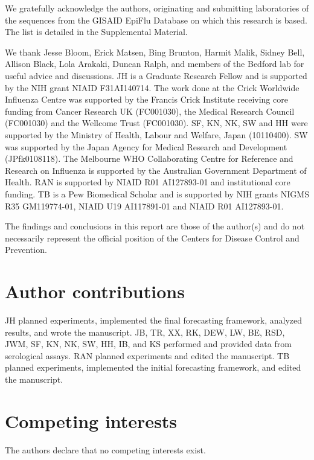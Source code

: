 \documentclass[9pt,lineno]{elife} %
\providecommand{\DIFaddbegin}{} %
\providecommand{\DIFaddend}{} %
\providecommand{\DIFdelbegin}{} %
\providecommand{\DIFdelend}{} %
\providecommand{\DIFaddbegin}{} %
\providecommand{\DIFaddend}{} %
\providecommand{\DIFdelbegin}{} %
\providecommand{\DIFdelend}{} %
\newcommand{\DIFscaledelfig}{0.5}
\newlength{\DIFdelgraphicswidth} %
\newlength{\DIFdelgraphicsheight} %
\newcommand{\DIFaddincludegraphics}[2][]{{\color{blue}\fbox{\DIFOincludegraphics[#1]{#2}}}} %
\newcommand{\DIFdelincludegraphics}[2][]{%
\sbox{\DIFdelgraphicsbox}{\DIFOincludegraphics[#1]{#2}}%
\settoboxwidth{\DIFdelgraphicswidth}{\DIFdelgraphicsbox} %
\settoboxtotalheight{\DIFdelgraphicsheight}{\DIFdelgraphicsbox} %
\scalebox{\DIFscaledelfig}{%
\parbox[b]{\DIFdelgraphicswidth}{\usebox{\DIFdelgraphicsbox}\\[-\baselineskip] \rule{\DIFdelgraphicswidth}{0em}}\llap{\resizebox{\DIFdelgraphicswidth}{\DIFdelgraphicsheight}{%
\setlength{\unitlength}{\DIFdelgraphicswidth}%
\begin{picture}(1,1)%
\thicklines\linethickness{2pt} %
{\color[rgb]{1,0,0}\put(0,0){\framebox(1,1){}}}%
{\color[rgb]{1,0,0}\put(0,0){\line( 1,1){1}}}%
{\color[rgb]{1,0,0}\put(0,1){\line(1,-1){1}}}%
\end{picture}%
}\hspace*{3pt}}} %
} %
\DeclareRobustCommand{\DIFaddbegin}{\DIFOaddbegin \let\includegraphics\DIFaddincludegraphics} %
\DeclareRobustCommand{\DIFaddend}{\DIFOaddend \let\includegraphics\DIFOincludegraphics} %
\DeclareRobustCommand{\DIFdelbegin}{\DIFOdelbegin \let\includegraphics\DIFdelincludegraphics} %
\DeclareRobustCommand{\DIFdelend}{\DIFOaddend \let\includegraphics\DIFOincludegraphics} %
\begin{document}
We gratefully acknowledge the authors, originating and submitting laboratories of the sequences from the GISAID EpiFlu Database \DIFdelbegin %
\DIFdelend \DIFaddbegin \citep{shu2017gisaid} \DIFaddend on which this research is based. The list is detailed in the Supplemental Material.

We thank Jesse Bloom, Erick Matsen, Bing Brunton, Harmit Malik, Sidney Bell, Allison Black, Lola Arakaki, Duncan Ralph, and members of the Bedford lab for useful advice and discussions.
JH is a Graduate Research Fellow and is supported by the NIH grant NIAID F31AI140714.
The work done at the Crick Worldwide Influenza Centre was supported by the Francis Crick Institute receiving core funding from Cancer Research UK (FC001030), the Medical Research Council (FC001030) and the Wellcome Trust (FC001030).
SF, KN, NK, SW and HH were supported by the Ministry of Health, Labour and Welfare, Japan (10110400).
SW was supported by the Japan Agency for Medical Research and Development (JPfk0108118).
The Melbourne WHO Collaborating Centre for Reference and Research on Influenza is supported by the Australian Government Department of Health.
RAN is supported by NIAID R01 AI127893-01 and institutional core funding.
TB is a Pew Biomedical Scholar and is supported by NIH grants NIGMS R35 GM119774-01, NIAID U19 AI117891-01 and NIAID R01 AI127893-01.

The findings and conclusions in this report are those of the author(s) and do not necessarily represent the official position of the Centers for Disease Control and Prevention.

\section*{Author contributions}

JH planned experiments, implemented the final forecasting framework, analyzed results, and wrote the manuscript.
JB, TR, XX, RK, DEW, LW, BE, RSD, JWM, SF, KN, NK, SW, HH, IB, and KS performed and provided data from serological assays.
RAN planned experiments and edited the manuscript.
TB planned experiments, implemented the initial forecasting framework, and edited the manuscript.

\section*{Competing interests}

The authors declare that no competing interests exist.
\end{document}
